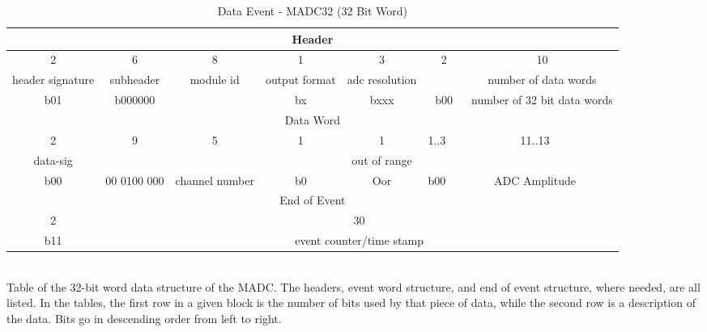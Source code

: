 \begin{landscape}
\begin{table}[]
    \centering
    \small
    \caption{\label{tab:word_MADC}Data Event - MADC32 (32 Bit Word)}
    \begin{tabular}{c|c|c|c|c|c|c|c|c|c|c|c|c|c|c|c|c|c|c|c|c|c|c|c|c|c|c|c|c|c|c|c}
        \toprule
        \multicolumn{32}{c}{Header} \\
        \hline
        \multicolumn{2}{c|}{2} & \multicolumn{6}{|c|}{6} & \multicolumn{8}{|c|}{8} & 1 & \multicolumn{3}{|c|}{3} & \multicolumn{2}{|c|}{2} & \multicolumn{10}{|c}{10} \\
        \multicolumn{2}{c|}{header signature} & \multicolumn{6}{|c|}{subheader} & \multicolumn{8}{|c|}{module id} & output format & \multicolumn{3}{|c|}{adc resolution} & \multicolumn{2}{|c|}{} & \multicolumn{10}{|c}{number of data words} \\
        \hline
        \multicolumn{2}{c|}{b01} & \multicolumn{6}{|c|}{b000000} & \multicolumn{8}{|c|}{} & bx & \multicolumn{3}{|c|}{bxxx} & \multicolumn{2}{|c|}{b00} & \multicolumn{10}{|c}{number of 32 bit data words} \\
        \midrule
        \multicolumn{32}{c}{Data Word} \\
        \hline
        \multicolumn{2}{c|}{2} & \multicolumn{9}{|c|}{9} & \multicolumn{5}{|c|}{5} & 1 & 1 & \multicolumn{3}{|c|}{1..3} & \multicolumn{11}{|c}{11..13} \\
        \multicolumn{2}{c|}{data-sig} & \multicolumn{9}{|c|}{} & \multicolumn{5}{|c|}{} &  & out of range & \multicolumn{3}{|c|}{} & \multicolumn{11}{|c}{} \\
        \hline
        \multicolumn{2}{c|}{b00} & \multicolumn{9}{|c|}{00 0100 000} & \multicolumn{5}{|c|}{channel number} & b0  & Oor & \multicolumn{3}{|c|}{b00} & \multicolumn{11}{|c}{ADC Amplitude} \\
        \midrule
        \multicolumn{32}{c}{End of Event} \\
        \hline
        \multicolumn{2}{c|}{2} & \multicolumn{30}{|c}{30} \\
        \hline
        \multicolumn{2}{c|}{b11} & \multicolumn{30}{|c}{event counter/time stamp} \\
        \bottomrule
    \end{tabular}
    \\[2pt]
    \footnotesize
    Table of the 32-bit word data structure of the MADC. The headers, event word structure, and end of event structure, where needed, are all listed. In the tables, the first row in a given block is the number of bits used by that piece of data, while the second row is a description of the data. Bits go in descending order from left to right.
    \end{table}
    

\end{landscape}
